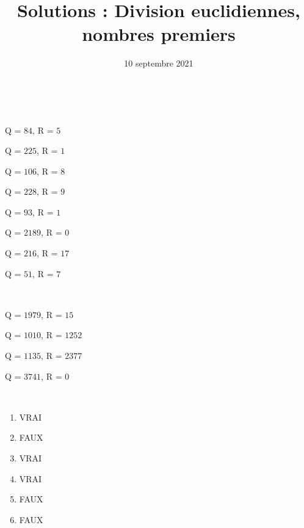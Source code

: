 \documentclass[a4paper,12pt]{article}
\title{Solutions : Division euclidiennes, nombres premiers}
\date{10 septembre 2021}
\author{}
\begin{document}
\maketitle

\begin{exercice}\ 

	\begin{enumerate}
		\begin{minipage}{0.45\linewidth}
			\item Q = $84$, R = $5$
			\item Q = $225$, R = $1$
			\item Q = $106$, R = $8$
			\item Q = $228$, R = $9$
		\end{minipage}
		\begin{minipage}{0.45\linewidth}
			\item Q = $93$, R = $1$
			\item Q = $2189$, R = $0$
			\item Q = $216$, R = $17$
			\item Q = $51$, R = $7$
		\end{minipage}
	\end{enumerate}
\end{exercice}

\begin{exercice}\ 
	
	\begin{enumerate}
		\begin{minipage}{0.45\linewidth}
			\item Q = $1979$, R = $15$
			\item Q = $1010$, R = $1252$
		\end{minipage}
		\begin{minipage}{0.45\linewidth}
			\item Q = $1135$, R = $2377$
			\item Q = $3741$, R = $0$
		\end{minipage}
	\end{enumerate}
\end{exercice}

\begin{exercice}\ 
	
	\begin{enumerate}
		\item VRAI
		\item FAUX
		\item VRAI
		\item VRAI
		\item FAUX
		\item FAUX
	\end{enumerate}
\end{exercice}
\end{document}
